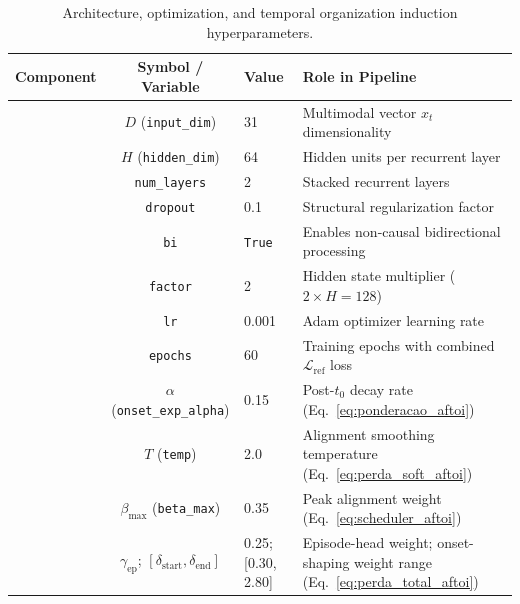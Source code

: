 \documentclass[a4paper,fleqn]{cas-dc}
\begin{document}
\begin{table}[!tbp]
\centering
\caption{Architecture, optimization, and temporal organization induction hyperparameters.}
\label{tab:hiperparametros_treinamento}
\footnotesize
\setlength{\tabcolsep}{6pt}
\renewcommand{\arraystretch}{1.18}
\begin{tabularx}{\textwidth}{l c l X}
\toprule
\textbf{Component} & \textbf{Symbol / Variable} & \textbf{Value} & \textbf{Role in Pipeline} \\
\midrule
{}
 & $D$ (\texttt{input\_dim})   & 31   & Multimodal vector $x_t$ dimensionality \\
 & $H$ (\texttt{hidden\_dim})  & 64   & Hidden units per recurrent layer \\
 & \texttt{num\_layers}         & 2    & Stacked recurrent layers \\
 & \texttt{dropout}            & 0.1  & Structural regularization factor \\
\midrule
{}
 & \texttt{bi}                 & \texttt{True} & Enables non-causal bidirectional processing \\
 & \texttt{factor}             & 2     & Hidden state multiplier ($2 \times H = 128$) \\
 & \texttt{lr}                 & 0.001 & Adam optimizer learning rate \\
 & \texttt{epochs}             & 60    & Training epochs with combined $\mathcal{L}_{\text{ref}}$ loss \\
\midrule
{}
 & {\color{\revcolor}$\alpha$ (\texttt{onset\_exp\_alpha})} & {\color{\revcolor}0.15} & {\color{\revcolor}Post-$t_0$ decay rate (Eq.~\ref{eq:ponderacao_aftoi})} \\
 & {\color{\revcolor}$T$ (\texttt{temp})}            & {\color{\revcolor}2.0}  & {\color{\revcolor}Alignment smoothing temperature (Eq.~\ref{eq:perda_soft_aftoi})} \\
 & {\color{\revcolor}$\beta_{\max}$ (\texttt{beta\_max})} & {\color{\revcolor}0.35} & {\color{\revcolor}Peak alignment weight (Eq.~\ref{eq:scheduler_aftoi})} \\
 & {\color{\revcolor}$\gamma_{\mathrm{ep}}$; $[\delta_{\text{start}},\delta_{\text{end}}]$} & {\color{\revcolor}0.25; [0.30, 2.80]} & {\color{\revcolor}Episode-head weight; onset-shaping weight range (Eq.~\ref{eq:perda_total_aftoi})} \\

\end{tabularx}
\end{table}
\end{document}
